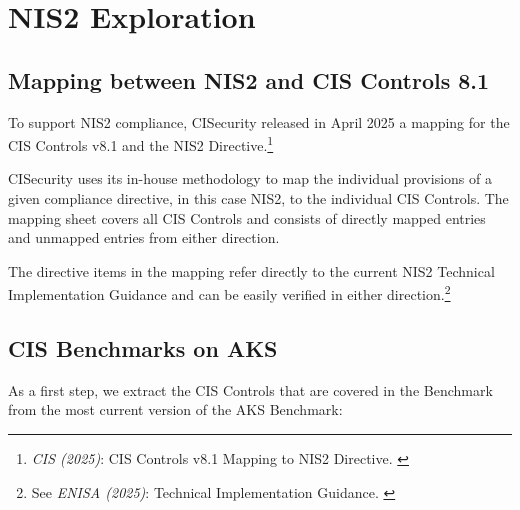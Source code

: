 %
%

\pagebreak
\section{NIS2 Exploration}

\onehalfspacing

\subsection{Mapping between NIS2 and CIS Controls 8.1}

To support NIS2 compliance, CISecurity released in April 2025 a mapping for the CIS Controls v8.1 and the NIS2 Directive.\footnote{\textit{CIS (2025)}: CIS Controls v8.1 Mapping to NIS2 Directive. \cite{cisMapNis2}}

CISecurity uses its in-house methodology to map the individual provisions of a given compliance directive, in this case NIS2, to the individual CIS Controls. The mapping sheet covers all CIS Controls and consists of directly mapped entries and unmapped entries from either direction.

The directive items in the mapping refer directly to the current NIS2 Technical Implementation Guidance and can be easily verified in either direction.\footnote{See \textit{ENISA (2025)}: Technical Implementation Guidance. \cite{enisaTech}}

\subsection{CIS Benchmarks on AKS}

As a first step, we extract the CIS Controls that are covered in the Benchmark from the most current version of the AKS Benchmark:

